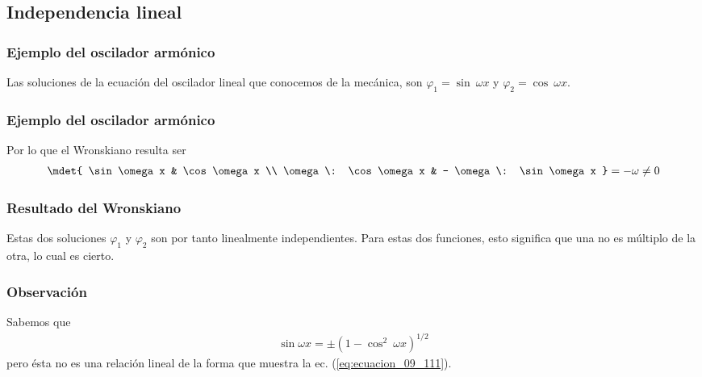 \subsection{Independencia lineal}
\begin{frame}
\frametitle{Ejemplo del oscilador armónico}
Las soluciones de la ecuación del oscilador lineal que conocemos de la mecánica, son $\varphi_{1} = \sin \: \omega x$ y $\varphi_{2} = \cos \: \omega x$.
\end{frame}
\begin{frame}
\frametitle{Ejemplo del oscilador armónico}
Por lo que el Wronskiano resulta ser
\begin{align*}
\mdet{
\sin \omega x & \cos \omega x \\
\omega \: \cos \omega x & - \omega \: \sin \omega x
} = -\omega \neq 0
\end{align*}
\end{frame}
\begin{frame}
\frametitle{Resultado del Wronskiano}
 Estas dos soluciones $\varphi_{1}$ y $\varphi_{2}$ son por tanto linealmente independientes. Para estas dos funciones, esto significa que una no es múltiplo de la otra, lo cual es cierto.
\end{frame}
\begin{frame}
\frametitle{Observación}
Sabemos que
\begin{align*}
\sin \omega x = \pm (1 - \cos^{2} \: \omega x)^{1/2}
\end{align*}
pero ésta no es una relación lineal de la forma que muestra la ec. (\ref{eq:ecuacion_09_111}).
\end{frame}
